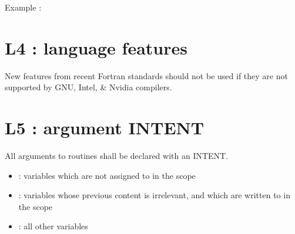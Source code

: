 \documentclass[letterpaper,10pt,english]{sphinxmanual}
\begin{document}
\sphinxAtStartPar
Example :
\def\sphinxLiteralBlockLabel{\label{\detokenize{rules/L3:id1}}}
\begin{sphinxVerbatim}[commandchars=\\\{\}]


\end{sphinxVerbatim}

\sphinxstepscope


\section{L4 : language features}
\label{\detokenize{rules/L4:l4-language-features}}\label{\detokenize{rules/L4::doc}}
\sphinxAtStartPar
New features from recent Fortran standards should not be
used if they are not supported by GNU, Intel, \& Nvidia compilers.

\sphinxstepscope


\section{L5 : argument INTENT}
\label{\detokenize{rules/L5:l5-argument-intent}}\label{\detokenize{rules/L5::doc}}
\sphinxAtStartPar
All arguments to routines shall be declared with an INTENT.
\begin{itemize}
\item {} 
\sphinxAtStartPar
{} : variables which are not assigned to in the scope

\item {} 
\sphinxAtStartPar
{} : variables whose previous content is irrelevant, and which are written to in the scope

\item {} 
\sphinxAtStartPar
{} : all other variables

\end{itemize}
\end{document}
